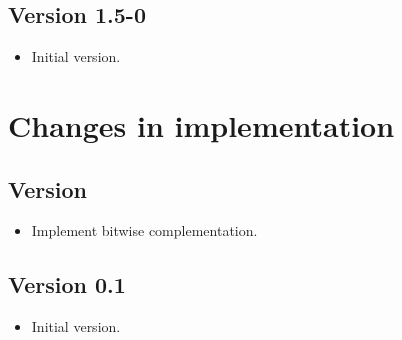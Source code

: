 \subsection{Version 1.5-0}

\begin{itemize}
\item Initial version.
\end{itemize}


\ifthenelse%
    {}%
    {
\section{Changes in \eacsl implementation}

\subsection{Version \eacslversion}

\begin{itemize}
\item Implement bitwise complementation.
\end{itemize}

\subsection{Version 0.1}

\begin{itemize}
\item Initial version.
\end{itemize}

    }%
    {}
